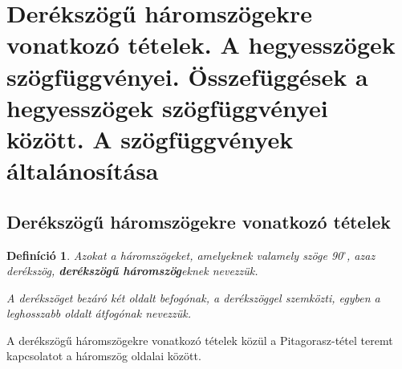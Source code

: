 \documentclass[12pt,a4paper]{article}
\newtheorem{definition}{Definíció} [section]
\begin{document}
\section{Derékszögű háromszögekre vonatkozó tételek. A hegyesszögek szögfüggvényei. Összefüggések a hegyesszögek szögfüggvényei között. A szögfüggvények általánosítása}

\subsection{Derékszögű háromszögekre vonatkozó tételek}
\begin{definition}
Azokat a háromszögeket, amelyeknek valamely szöge 90$^\circ$, azaz derékszög, \textbf{derékszögű háromszög}eknek nevezzük.

A derékszöget bezáró két oldalt befogónak, a derékszöggel szemközti, egyben a leghosszabb oldalt átfogónak nevezzük.
\end{definition}

A derékszögű háromszögekre vonatkozó tételek közül a Pitagorasz-tétel teremt kapcsolatot a háromszög oldalai között.
\end{document}
